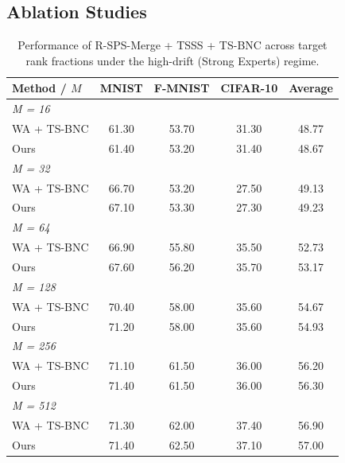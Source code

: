 \documentclass{article}
\theoremstyle{plain}
\theoremstyle{definition}
\theoremstyle{remark}
\begin{document}
\subsection{Ablation Studies}

\begin{table}[t]
\begin{minipage}{0.48\textwidth}
\centering
\caption{Influence of calibration sample size $M$ on multi-task model merging accuracy (top-1 \%) under the high-drift (Strong Experts) regime.}
\label{tab:ablation-calib-size}
\vskip 0.1in
\scriptsize
\setlength{\tabcolsep}{2.5pt}
\begin{tabular}{lcccc}
\toprule
Method / $M$ & MNIST & F-MNIST & CIFAR-10 & Average \\
\midrule
\textit{M = 16} \\
WA + TS-BNC & 61.30 & 53.70 & 31.30 & 48.77 \\
Ours & 61.40 & 53.20 & 31.40 & 48.67 \\
\midrule
\textit{M = 32} \\
WA + TS-BNC & 66.70 & 53.20 & 27.50 & 49.13 \\
Ours & 67.10 & 53.30 & 27.30 & 49.23 \\
\midrule
\textit{M = 64} \\
WA + TS-BNC & 66.90 & 55.80 & 35.50 & 52.73 \\
Ours & 67.60 & 56.20 & 35.70 & 53.17 \\
\midrule
\textit{M = 128} \\
WA + TS-BNC & 70.40 & 58.00 & 35.60 & 54.67 \\
Ours & 71.20 & 58.00 & 35.60 & 54.93 \\
\midrule
\textit{M = 256} \\
WA + TS-BNC & 71.10 & 61.50 & 36.00 & 56.20 \\
Ours & 71.40 & 61.50 & 36.00 & 56.30 \\
\midrule
\textit{M = 512} \\
WA + TS-BNC & 71.30 & 62.00 & 37.40 & 56.90 \\
Ours & 71.40 & 62.50 & 37.10 & 57.00 \\
\bottomrule
\end{tabular}
\end{minipage}
\hfill
\begin{minipage}{0.48\textwidth}
\centering
\caption{Performance of R-SPS-Merge + TSSS + TS-BNC across target rank fractions under the high-drift (Strong Experts) regime.}
\label{tab:ablation-randomized-svd}
\vskip 0.1in
\scriptsize
\setlength{\tabcolsep}{1.2pt}

\end{minipage}
\end{table}
\end{document}
